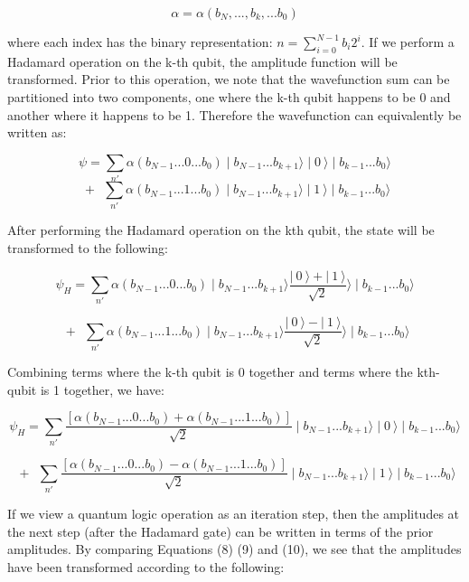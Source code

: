 \documentclass[reqno]{amsart}
\theoremstyle{definition}
\theoremstyle{remark}
\begin{document}
\begin{equation}
\alpha=\alpha(b_{N}, ... ,b_{k}, ...b_{0})
\end{equation}


\noindent
where each index has the binary representation: $n = \sum_{i=0}^{N-1} b_{i} 2^{i}$.
If we perform a Hadamard operation on the k-th qubit, the amplitude function will be transformed. Prior to this operation, we note that the wavefunction sum can be partitioned into two components, one where the k-th qubit happens to be 0 and another where it happens to be 1. 
Therefore the wavefunction can equivalently be written as:

\begin{equation}
\psi=\sum_{n'} \alpha(b_{N-1}...0...b_{0})\mid b_{N-1}...b_{k+1}\rangle\mid0\:\rangle\mid b_{k-1}...b_{0}\rangle 
\end{equation}
$$
\: + \:\:\sum_{n'} \alpha(b_{N-1}...1...b_{0})\mid b_{N-1}...b_{k+1}\rangle\mid1\:\rangle\mid b_{k-1}...b_{0}\rangle
$$

\noindent
After performing the Hadamard operation on the kth qubit, the state will be transformed to the following:

\begin{equation}
\psi_H=\sum_{n'} \alpha(b_{N-1}...0...b_{0})\mid b_{N-1}...b_{k+1}\rangle\frac{|\:0\:\rangle+|\:1\:\rangle}{\sqrt{2}}\rangle\mid b_{k-1}...b_{0}\rangle 
\end{equation}

$$
\: + \:\:\sum_{n'} \alpha(b_{N-1}...1...b_{0})\mid b_{N-1}...b_{k+1}\rangle\frac{|\:0\:\rangle-|\:1\:\rangle}{\sqrt{2}}\rangle\mid b_{k-1}...b_{0}\rangle
$$

\noindent
Combining terms where the k-th qubit is 0 together and terms where the kth-qubit is 1 together, we have:

\begin{equation}
\psi_H=\sum_{n'} \frac{[\alpha(b_{N-1}...0...b_{0})+ \alpha(b_{N-1}...1...b_{0})]}{\sqrt{2}}\mid b_{N-1}...b_{k+1}\rangle\mid0\:\rangle\mid b_{k-1}...b_{0}\rangle
\end{equation}

$$
\: + \:\:\sum_{n'} \frac{ [\alpha(b_{N-1}...0...b_{0})- \alpha(b_{N-1}...1...b_{0})]}{\sqrt{2}}\mid b_{N-1}...b_{k+1}\rangle\mid1\:\rangle\mid b_{k-1}...b_{0}\rangle
$$

\noindent
If we view a quantum logic operation as an iteration step, then the amplitudes at the next step (after the Hadamard gate) can be written in terms of the prior amplitudes. By comparing Equations (8) (9) and (10), we see that the amplitudes have been transformed according to the following:
\end{document}
